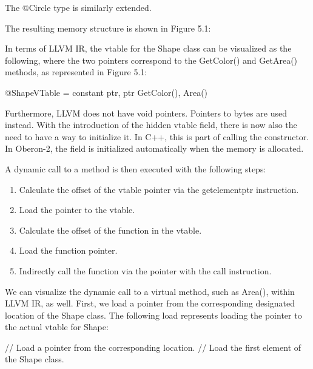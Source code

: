 The @Circle type is similarly extended.

The resulting memory structure is shown in Figure 5.1:


In terms of LLVM IR, the vtable for the Shape class can be visualized as the following, where the two pointers correspond to the GetColor() and GetArea() methods, as represented in Figure 5.1:

\begin{shell}
@ShapeVTable = constant { ptr, ptr } { GetColor(), Area() }
\end{shell}

Furthermore, LLVM does not have void pointers. Pointers to bytes are used instead. With the introduction of the hidden vtable field, there is now also the need to have a way to initialize it. In C++, this is part of calling the constructor. In Oberon-2, the field is initialized automatically when the memory is allocated.

A dynamic call to a method is then executed with the following steps:

\begin{enumerate}
\item
Calculate the offset of the vtable pointer via the getelementptr instruction.

\item
Load the pointer to the vtable.

\item
Calculate the offset of the function in the vtable.

\item
Load the function pointer.

\item
Indirectly call the function via the pointer with the call instruction.
\end{enumerate}

We can visualize the dynamic call to a virtual method, such as Area(), within LLVM IR, as well. First, we load a pointer from the corresponding designated location of the Shape class. The following load represents loading the pointer to the actual vtable for Shape:

\begin{shell}
// Load a pointer from the corresponding location.
// Load the first element of the Shape class.
\end{shell}

